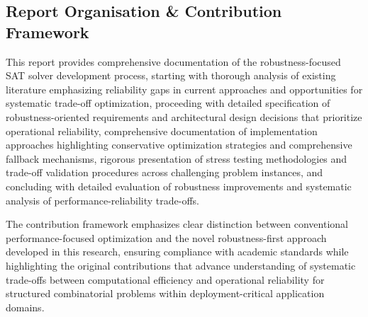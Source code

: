 \subsection{Report Organisation \& Contribution Framework}

This report provides comprehensive documentation of the robustness-focused SAT solver development process, starting with thorough analysis of existing literature emphasizing reliability gaps in current approaches and opportunities for systematic trade-off optimization, proceeding with detailed specification of robustness-oriented requirements and architectural design decisions that prioritize operational reliability, comprehensive documentation of implementation approaches highlighting conservative optimization strategies and comprehensive fallback mechanisms, rigorous presentation of stress testing methodologies and trade-off validation procedures across challenging problem instances, and concluding with detailed evaluation of robustness improvements and systematic analysis of performance-reliability trade-offs.

The contribution framework emphasizes clear distinction between conventional per\-formance-focused optimization and the novel robustness-first approach developed in this research, ensuring compliance with academic standards while highlighting the original contributions that advance understanding of systematic trade-offs between computational efficiency and operational reliability for structured combinatorial problems within deployment-critical application domains.